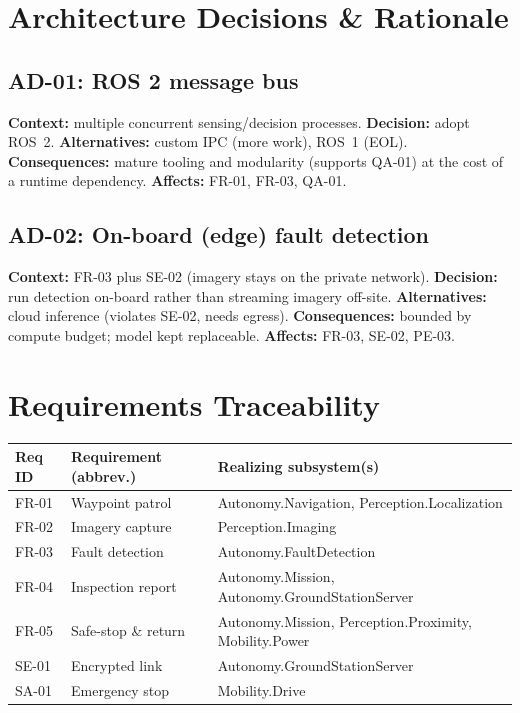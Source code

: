 \documentclass[11pt,letterpaper]{article}
\begin{document}
\section{Architecture Decisions \& Rationale}
\subsection{AD-01: ROS 2 message bus}
\textbf{Context:} multiple concurrent sensing/decision processes. \textbf{Decision:}
adopt ROS~2. \textbf{Alternatives:} custom IPC (more work), ROS~1 (EOL).
\textbf{Consequences:} mature tooling and modularity (supports QA-01) at the cost of
a runtime dependency. \textbf{Affects:} FR-01, FR-03, QA-01.
\subsection{AD-02: On-board (edge) fault detection}
\textbf{Context:} FR-03 plus SE-02 (imagery stays on the private network).
\textbf{Decision:} run detection on-board rather than streaming imagery off-site.
\textbf{Alternatives:} cloud inference (violates SE-02, needs egress).
\textbf{Consequences:} bounded by compute budget; model kept replaceable. \textbf{Affects:} FR-03, SE-02, PE-03.

\section{Requirements Traceability}
\begin{table}[H]\begin{center}\begin{tabular}{ | p{2cm} | p{5.5cm} | p{5cm} |}\hline
\textbf{Req ID} & \textbf{Requirement (abbrev.)} & \textbf{Realizing subsystem(s)} \\ \hline
FR-01 & Waypoint patrol & Autonomy.Navigation, Perception.Localization \\ \hline
FR-02 & Imagery capture & Perception.Imaging \\ \hline
FR-03 & Fault detection & Autonomy.FaultDetection \\ \hline
FR-04 & Inspection report & Autonomy.Mission, Autonomy.GroundStationServer \\ \hline
FR-05 & Safe-stop \& return & Autonomy.Mission, Perception.Proximity, Mobility.Power \\ \hline
SE-01 & Encrypted link & Autonomy.GroundStationServer \\ \hline
SA-01 & Emergency stop & Mobility.Drive \\ \hline
\end{tabular}\end{center}\end{table}


{}
\end{document}

